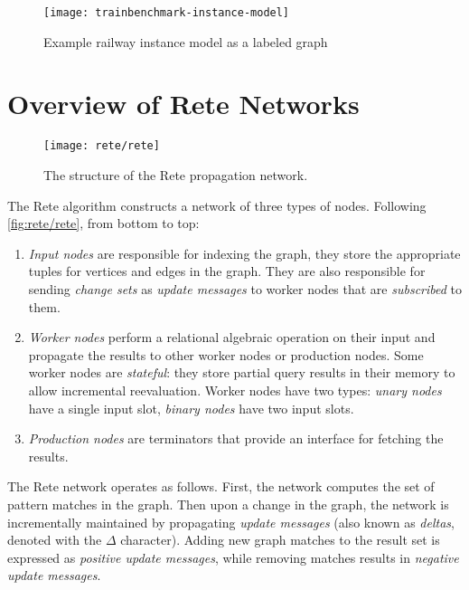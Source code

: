 \begin{figure}
	\centering
	\texttt{[image: trainbenchmark-instance-model]}
	\caption{Example railway instance model as a labeled graph}
	\label{fig:trainbenchmark-instance-model}
\end{figure}

\section{Overview of Rete Networks}
\label{sec:rete}

\begin{figure}
	\centering
	\texttt{[image: rete/rete]}
	\caption{The structure of the Rete propagation network.}
	\label{fig:rete/rete}
\end{figure}


The Rete algorithm constructs a network of three types of nodes. Following \autoref{fig:rete/rete}, from bottom to top:

\begin{enumerate}
	\item \emph{Input nodes} are responsible for indexing the graph, \ie they store the appropriate tuples for vertices and edges in the graph. They are also responsible for sending \emph{change sets} as \emph{update messages} to worker nodes that are \emph{subscribed} to them.
	\item \emph{Worker nodes} perform a relational algebraic operation on their input and propagate the results to other worker nodes or production nodes. Some worker nodes are \emph{stateful}: they store partial query results in their memory to allow incremental reevaluation.
	Worker nodes have two types: \emph{unary nodes} have a single input slot, \emph{binary nodes} have two input slots.
	\item \emph{Production nodes} are terminators that provide an interface for fetching the results.
\end{enumerate}

The Rete network operates as follows. First, the network computes the set of pattern matches in the graph. Then upon a change in the graph, the network is incrementally maintained by propagating \emph{update messages} (also known as \emph{deltas}, denoted with the $\Delta$ character). Adding new graph matches to the result set is expressed as \emph{positive update messages}, while removing matches results in \emph{negative update messages}.

